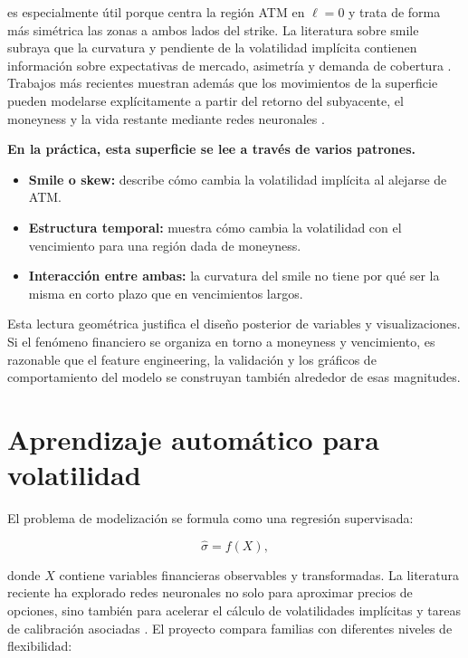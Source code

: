 es especialmente útil porque centra la región ATM en \(\ell=0\) y trata de forma más simétrica las zonas a ambos lados del strike. La literatura sobre smile subraya que la curvatura y pendiente de la volatilidad implícita contienen información sobre expectativas de mercado, asimetría y demanda de cobertura \citep{derman2016volatility}. Trabajos más recientes muestran además que los movimientos de la superficie pueden modelarse explícitamente a partir del retorno del subyacente, el moneyness y la vida restante mediante redes neuronales \citep{cao2019neural}.

\textbf{En la práctica, esta superficie se lee a través de varios patrones.}

\begin{itemize}
  \item \textbf{Smile o skew:} describe cómo cambia la volatilidad implícita al alejarse de ATM.
  \item \textbf{Estructura temporal:} muestra cómo cambia la volatilidad con el vencimiento para una región dada de moneyness.
  \item \textbf{Interacción entre ambas:} la curvatura del smile no tiene por qué ser la misma en corto plazo que en vencimientos largos.
\end{itemize}

Esta lectura geométrica justifica el diseño posterior de variables y visualizaciones. Si el fenómeno financiero se organiza en torno a moneyness y vencimiento, es razonable que el feature engineering, la validación y los gráficos de comportamiento del modelo se construyan también alrededor de esas magnitudes.

\section{Aprendizaje automático para volatilidad}
\label{sec:ml-vol}

El problema de modelización se formula como una regresión supervisada:

\begin{equation}
\hat{\sigma}=f(X),
\label{eq:modelo-general}
\end{equation}

donde \(X\) contiene variables financieras observables y transformadas. La literatura reciente ha explorado redes neuronales no solo para aproximar precios de opciones, sino también para acelerar el cálculo de volatilidades implícitas y tareas de calibración asociadas \citep{liu2019pricing}. El proyecto compara familias con diferentes niveles de flexibilidad:

